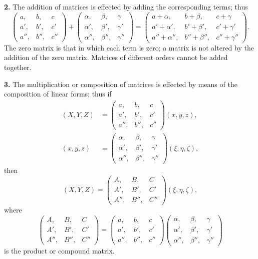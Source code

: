 \documentclass[12pt,a4paper]{article}
\theoremstyle{definition}
\begin{document}
\medskip
\noindent\textbf{2.} The addition of matrices is effected by adding the corresponding terms; thus
\[
\begin{pmatrix} a, & b, & c \\ a', & b', & c' \\ a'', & b'', & c'' \end{pmatrix}
+
\begin{pmatrix} \alpha, & \beta, & \gamma \\ \alpha', & \beta', & \gamma' \\ \alpha'', & \beta'', & \gamma'' \end{pmatrix}
=
\begin{pmatrix} a+\alpha, & b+\beta, & c+\gamma \\ a'+\alpha', & b'+\beta', & c'+\gamma' \\ a''+\alpha'', & b''+\beta'', & c''+\gamma'' \end{pmatrix}.
\]
The zero matrix is that in which each term is zero; a matrix is not altered by the addition of the zero matrix. Matrices of different orders cannot be added together.

\medskip
\noindent\textbf{3.} The multiplication or composition of matrices is effected by means of the composition of linear forms; thus if
\begin{align*}
(X,Y,Z) &= \begin{pmatrix} a, & b, & c \\ a', & b', & c' \\ a'', & b'', & c'' \end{pmatrix}(x,y,z), \\
(x,y,z) &= \begin{pmatrix} \alpha, & \beta, & \gamma \\ \alpha', & \beta', & \gamma' \\ \alpha'', & \beta'', & \gamma'' \end{pmatrix}(\xi,\eta,\zeta),
\end{align*}
then
\[
(X,Y,Z) = \begin{pmatrix} A, & B, & C \\ A', & B', & C' \\ A'', & B'', & C'' \end{pmatrix}(\xi,\eta,\zeta),
\]
where
\[
\begin{pmatrix} A, & B, & C \\ A', & B', & C' \\ A'', & B'', & C'' \end{pmatrix}
=
\begin{pmatrix} a, & b, & c \\ a', & b', & c' \\ a'', & b'', & c'' \end{pmatrix}
\begin{pmatrix} \alpha, & \beta, & \gamma \\ \alpha', & \beta', & \gamma' \\ \alpha'', & \beta'', & \gamma'' \end{pmatrix}
\]
is the product or compound matrix.
\end{document}
